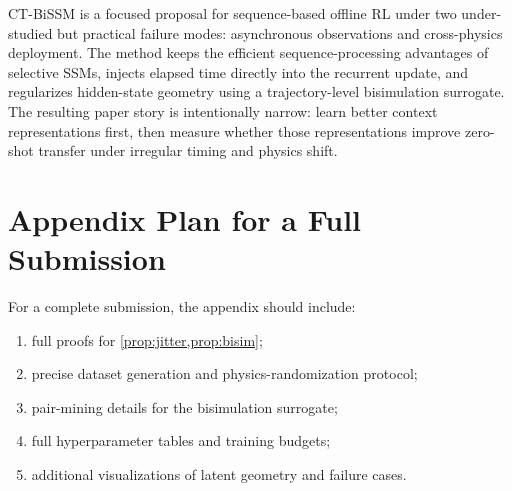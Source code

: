 \documentclass[11pt]{article}
\begin{document}
CT-BiSSM is a focused proposal for sequence-based offline RL under two under-studied but practical failure modes: asynchronous observations and cross-physics deployment. The method keeps the efficient sequence-processing advantages of selective SSMs, injects elapsed time directly into the recurrent update, and regularizes hidden-state geometry using a trajectory-level bisimulation surrogate. The resulting paper story is intentionally narrow: learn better context representations first, then measure whether those representations improve zero-shot transfer under irregular timing and physics shift.

\appendix
\section{Appendix Plan for a Full Submission}

For a complete submission, the appendix should include:
\begin{enumerate}
    \item full proofs for \cref{prop:jitter,prop:bisim};
    \item precise dataset generation and physics-randomization protocol;
    \item pair-mining details for the bisimulation surrogate;
    \item full hyperparameter tables and training budgets;
    \item additional visualizations of latent geometry and failure cases.
\end{enumerate}
\end{document}
